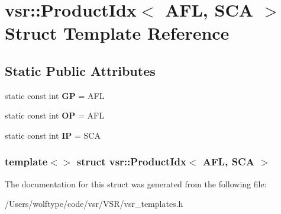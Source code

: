 \hypertarget{structvsr_1_1_product_idx_3_01_a_f_l_00_01_s_c_a_01_4}{\section{vsr\-:\-:Product\-Idx$<$ A\-F\-L, S\-C\-A $>$ Struct Template Reference}
\label{structvsr_1_1_product_idx_3_01_a_f_l_00_01_s_c_a_01_4}
}
\subsection*{Static Public Attributes}
\begin{DoxyCompactItemize}
\item 
\hypertarget{structvsr_1_1_product_idx_3_01_a_f_l_00_01_s_c_a_01_4_ae62d6e37e5d77a1fbe797e3f1536a5ff}{static const int {\bfseries G\-P} = A\-F\-L}\label{structvsr_1_1_product_idx_3_01_a_f_l_00_01_s_c_a_01_4_ae62d6e37e5d77a1fbe797e3f1536a5ff}

\item 
\hypertarget{structvsr_1_1_product_idx_3_01_a_f_l_00_01_s_c_a_01_4_a3756d17af69fae0c7dd8fe81feaa1155}{static const int {\bfseries O\-P} = A\-F\-L}\label{structvsr_1_1_product_idx_3_01_a_f_l_00_01_s_c_a_01_4_a3756d17af69fae0c7dd8fe81feaa1155}

\item 
\hypertarget{structvsr_1_1_product_idx_3_01_a_f_l_00_01_s_c_a_01_4_a4332ad55fbabf452eb43b56bc993fab7}{static const int {\bfseries I\-P} = S\-C\-A}\label{structvsr_1_1_product_idx_3_01_a_f_l_00_01_s_c_a_01_4_a4332ad55fbabf452eb43b56bc993fab7}

\end{DoxyCompactItemize}
\subsubsection*{template$<$$>$ struct vsr\-::\-Product\-Idx$<$ A\-F\-L, S\-C\-A $>$}



The documentation for this struct was generated from the following file\-:\begin{DoxyCompactItemize}
\item 
/\-Users/wolftype/code/vsr/\-V\-S\-R/vsr\-\_\-templates.\-h\end{DoxyCompactItemize}
